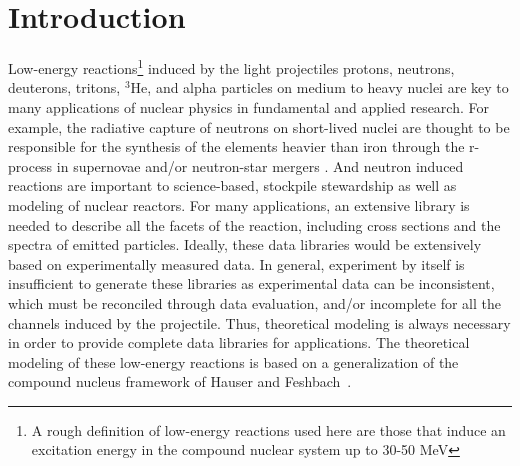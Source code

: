 \documentclass[
10pt,
showpacs,preprintnumbers,footinbib,
amsfonts,amsmath,amssymb,
aps,
prc,twocolumn,groupedaddress,superscriptaddress,
showkeys,
nofootinbib
]{revtex4-1}
\begin{document}
\section{Introduction}
Low-energy reactions\footnote{A rough definition of low-energy reactions used here are those that induce an excitation energy in the compound nuclear system up to 30-50 MeV} induced by the light projectiles protons, neutrons, deuterons, tritons, $^3$He, and alpha particles on medium to heavy nuclei are key to many applications of nuclear physics in fundamental and applied research.  For example, the radiative capture of neutrons on short-lived nuclei are thought to be responsible for the synthesis of the elements heavier than iron through the r-process \cite{Bur:1957} in supernovae and/or neutron-star mergers \cite{Kas:2017}. And neutron induced reactions are important to science-based, stockpile stewardship as well as modeling of nuclear reactors. For many applications, an extensive library is needed to describe all the facets of the reaction, including cross sections and the spectra of emitted particles. Ideally, these data libraries would be extensively based on experimentally measured data. In general, experiment by itself is insufficient to generate these libraries as experimental data can be inconsistent, which must be reconciled through data evaluation, and/or incomplete for all the channels induced by the projectile. Thus, theoretical modeling is always necessary in order to provide complete data libraries for applications. The theoretical modeling of these low-energy reactions is based on a generalization of the compound nucleus framework of Hauser and Feshbach~\cite{Hauser:1952}. 
\end{document}
